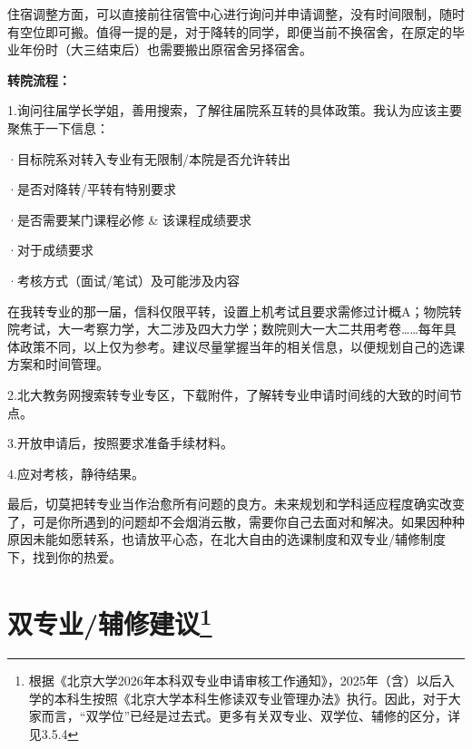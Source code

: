 \documentclass[11pt,oneside]{book}
\begin{document}
\vspace{10pt}

住宿调整方面，可以直接前往宿管中心进行询问并申请调整，没有时间限制，随时有空位即可搬。值得一提的是，对于降转的同学，即便当前不换宿舍，在原定的毕业年份时（大三结束后）也需要搬出原宿舍另择宿舍。

\vspace{10pt}

\textbf{转院流程：}

1.询问往届学长学姐，善用搜索，了解往届院系互转的具体政策。我认为应该主要聚焦于一下信息：

·目标院系对转入专业有无限制/本院是否允许转出

·是否对降转/平转有特别要求

·是否需要某门课程必修 \& 该课程成绩要求

·对于成绩要求

·考核方式（面试/笔试）及可能涉及内容

\vspace{10pt}

在我转专业的那一届，信科仅限平转，设置上机考试且要求需修过计概A；物院转院考试，大一考察力学，大二涉及四大力学；数院则大一大二共用考卷……每年具体政策不同，以上仅为参考。建议尽量掌握当年的相关信息，以便规划自己的选课方案和时间管理。

\vspace{10pt}

2.北大教务网搜索转专业专区，下载附件，了解转专业申请时间线的大致的时间节点。

\vspace{10pt}

3.开放申请后，按照要求准备手续材料。

\vspace{10pt}

4.应对考核，静待结果。

\vspace{10pt}

最后，切莫把转专业当作治愈所有问题的良方。未来规划和学科适应程度确实改变了，可是你所遇到的问题却不会烟消云散，需要你自己去面对和解决。如果因种种原因未能如愿转系，也请放平心态，在北大自由的选课制度和双专业/辅修制度下，找到你的热爱。

\section[双专业/辅修建议]{双专业/辅修建议\footnote{根据《北京大学2026年本科双专业申请审核工作通知》，2025年（含）以后入学的本科生按照《北京大学本科生修读双专业管理办法》执行。因此，对于大家而言，“双学位”已经是过去式。更多有关双专业、双学位、辅修的区分，详见3.5.4}}
\end{document}
